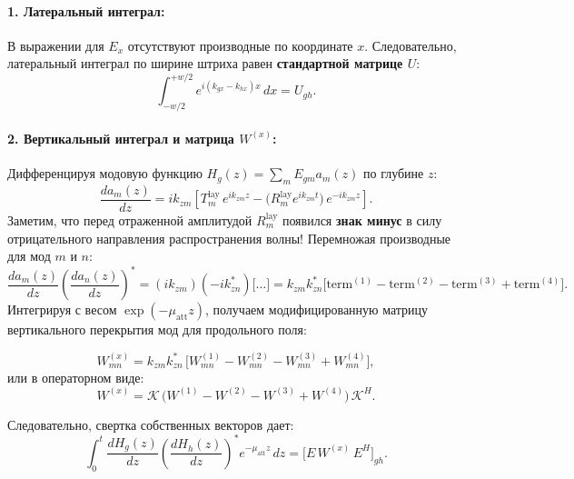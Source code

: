 \documentclass[a4paper,11pt]{article}
\begin{document}
\paragraph{1. Латеральный интеграл:}
В выражении для $E_x$ отсутствуют производные по координате $x$. Следовательно, латеральный интеграл по ширине штриха равен \textbf{стандартной матрице $U$}:
\begin{equation}
    \int_{-w/2}^{+w/2} e^{i(k_{gx} - k_{hx})x} \, dx = U_{gh}.
\end{equation}

\paragraph{2. Вертикальный интеграл и матрица $W^{(x)}$:}
Дифференцируя модовую функцию $H_g(z) = \sum_m E_{gm} a_m(z)$ по глубине $z$:
\begin{equation}
    \frac{d a_m(z)}{dz} = i k_{zm} \left[ T_m^{\text{lay}} \, e^{i k_{zm} z} - \big(R_m^{\text{lay}} e^{i k_{zm} t}\big) \, e^{-i k_{zm} z} \right].
\end{equation}
Заметим, что перед отраженной амплитудой $R_m^{\text{lay}}$ появился \textbf{знак минус} в силу отрицательного направления распространения волны!
Перемножая производные для мод $m$ и $n$:
\begin{equation}
    \frac{d a_m(z)}{dz} \left(\frac{d a_n(z)}{dz}\right)^* = (i k_{zm}) (-i k_{zn}^*) \Big[ \dots \Big] = k_{zm} k_{zn}^* \Big[ \text{term}^{(1)} - \text{term}^{(2)} - \text{term}^{(3)} + \text{term}^{(4)} \Big].
\end{equation}
Интегрируя с весом $\exp(-\mu_{\text{att}} z)$, получаем модифицированную матрицу вертикального перекрытия мод для продольного поля:
\begin{mathbox}
\begin{equation}
    W_{mn}^{(x)} = k_{zm} k_{zn}^* \, \Big[ W_{mn}^{(1)} - W_{mn}^{(2)} - W_{mn}^{(3)} + W_{mn}^{(4)} \Big],
    \label{eq:Wx_analytic}
\end{equation}
или в операторном виде:
\begin{equation}
    W^{(x)} = \mathcal{K} \, \Big( W^{(1)} - W^{(2)} - W^{(3)} + W^{(4)} \Big) \, \mathcal{K}^H.
\end{equation}
\end{mathbox}

Следовательно, свертка собственных векторов дает:
\begin{equation}
    \int_0^t \frac{d H_g(z)}{dz} \left(\frac{d H_h(z)}{dz}\right)^* e^{-\mu_{\text{att}} z} \, dz = \big[ E \, W^{(x)} \, E^H \big]_{gh}.
\end{equation}
\end{document}
